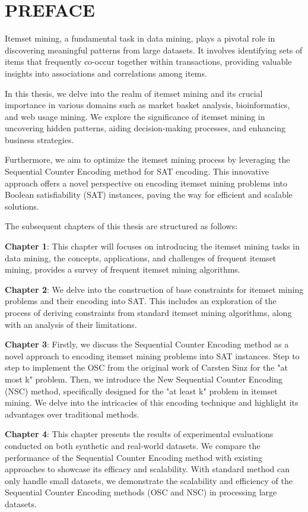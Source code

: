 \chapter*{PREFACE}
\fontsize{13}{15}\selectfont

Itemset mining, a fundamental task in data mining, plays a pivotal role in discovering meaningful patterns from large datasets. It involves identifying sets of items that frequently co-occur together within transactions, providing valuable insights into associations and correlations among items.

In this thesis, we delve into the realm of itemset mining and its crucial importance in various domains such as market basket analysis, bioinformatics, and web usage mining. We explore the significance of itemset mining in uncovering hidden patterns, aiding decision-making processes, and enhancing business strategies.

Furthermore, we aim to optimize the itemset mining process by leveraging the Sequential Counter Encoding method for SAT encoding. This innovative approach offers a novel perspective on encoding itemset mining problems into Boolean satisfiability (SAT) instances, paving the way for efficient and scalable solutions.

The subsequent chapters of this thesis are structured as follows:

\textbf{Chapter 1}: This chapter will focuses on introducing the itemset mining tasks in data mining, the concepts, applications, and challenges of frequent itemset mining, provides a survey of frequent itemset mining algorithms.

\textbf{Chapter 2}: We delve into the construction of base constraints for itemset mining problems and their encoding into SAT. This includes an exploration of the process of deriving constraints from standard itemset mining algorithms, along with an analysis of their limitations.

\textbf{Chapter 3}: Firstly, we discuss the Sequential Counter Encoding method as a novel approach to encoding itemset mining problems into SAT instances.
Step to step to implement the OSC from the original work of Carsten Sinz for the "at most k" problem.
Then, we introduce the New Sequential Counter Encoding (NSC) method, specifically designed for the "at least k" problem in itemset mining.
We delve into the intricacies of this encoding technique and highlight its advantages over traditional methods.

\textbf{Chapter 4}: This chapter presents the results of experimental evaluations conducted on both synthetic and real-world datasets.
We compare the performance of the Sequential Counter Encoding method with existing approaches to showcase its efficacy and scalability.
With standard method can only handle small datasets, we demonstrate the scalability and efficiency of the Sequential Counter Encoding methods (OSC and NSC) in processing large datasets.

